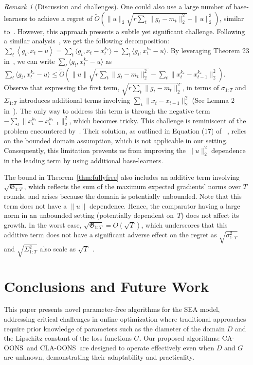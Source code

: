 \documentclass{article}
\theoremstyle{plain}
\theoremstyle{definition}
\theoremstyle{remark}
\newtheorem{remark}[theorem]{Remark}
\newcommand{\cawe}{{\sc CA-OONS}}
\newcommand{\claoons}{{\sc CLA-OONS}}
\newcommand{\inner}[2]{\left\langle #1, #2 \right\rangle}
\renewcommand{\tilde}{\widetilde}
\begin{document}
\begin{remark}[Discussion and challenges]
One could also  use a large number of base-learners to achieve a regret  of  $\tilde{O}(\|u\|_2 \sqrt{r \sum_t \|g_t-m_t\|_2^2}+\|u\|_2^3)$, similar to~\cite{chen2021impossible}. However, this approach presents a subtle yet significant challenge. Following a similar analysis~\cite{chen2021impossible}, we get the following decomposition: $\sum_t \inner{g_t}{x_t-u} =\sum_t \langle g_t,x_t-x_t^{k_*}\rangle+\sum_t \langle g_t, x_t^{k_*}-u\rangle$. By leveraging Theorem 23 in~\cite{chen2021impossible}, we can write $\sum_t \langle g_t, x_t^{k_*}-u\rangle$ as $\sum_t\langle g_t, x_t^{k_*}-u\rangle\leq \tilde{O}(\|u\| \sqrt{r \sum_t \|g_t-m_t\|_2^2}-\sum_t \|x_t^{k_*}-x_{t-1}^{k_*}\|_2^2)$. Observe that expressing the first term, $\sqrt{r \sum_t \|g_t-m_t\|_2^2}$, in terms of $\sigma_{1:T}$ and  $\Sigma_{1:T}$ introduces additional terms involving $\sum_t \|x_t-x_{t-1}\|_2^2$ (See Lemma 2 in~\cite{chen2024optimistic}). The only way to address this term is through the negative term $-\sum_t \|x_t^{k_*}-x_{t-1}^{k_*}\|_2^2$, which becomes tricky. This challenge is reminiscent of the problem encountered by~\cite{zhao2024adaptivity}. Their solution, as outlined in Equation (17) of ~\cite{zhao2024adaptivity}, relies on the bounded domain assumption, which is not applicable in our setting. Consequently, this limitation prevents us from improving the $\|u\|_2^2$ dependence in the leading term by using additional base-learners.


 

The bound in Theorem~\ref{thm:fullyfree} also includes an additive term involving $\sqrt{\mathfrak{G}_{1:T}}$, which reflects the sum of the maximum expected gradients'  norms over $T$ rounds, and arises because the domain is potentially unbounded. Note that this term does not have a $\|u\|$ dependence. Hence,  the comparator having a large norm in an unbounded setting (potentially dependent on~$T$) does not affect its growth.  In the worst case, $\sqrt{\mathfrak{G}_{1:T}}=O(\sqrt{T})$, which underscores that this additive term does not have a significant adverse effect on the regret as $\sqrt{\sigma_{1:T}^2}$ and $\sqrt{\Sigma_{1:T}^2}$ also scale as $\sqrt{T}$~\citep{sachs2023accelerated}.
\end{remark}


\section{Conclusions and Future Work}
This paper presents novel parameter-free algorithms for the SEA model, addressing critical challenges in online optimization where traditional approaches require prior knowledge of parameters such as the diameter of the domain $D$ and the Lipschitz constant of the loss functions $G$. Our proposed algorithms: \cawe\ and \claoons\ are designed to operate effectively even when $D$ and $G$ are unknown, demonstrating their adaptability and practicality.
\end{document}
